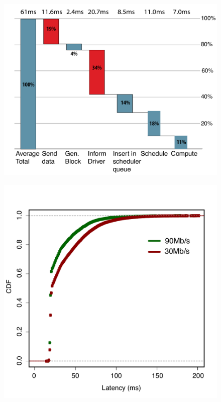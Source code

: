\begin{figure}[t!]
  \begin{center}
    \includegraphics[scale=0.40]{images_graphs/waterfall/Rplots_illustrator.pdf}
  \end{center}
  \caption{}
  \label{fig:SparkStreaming_time_breakdown}
\end{figure}
\begin{figure}[t!]
  \begin{center}
    \includegraphics[scale=0.40]{images_graphs/cdf_latencies/cdf_e2e_times.pdf}
  \end{center}
  \caption{}
  \label{fig:CDF_latencies}
\end{figure}

